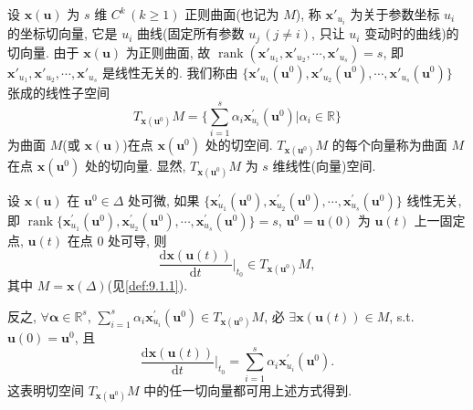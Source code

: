 \begin{definition}\label{def:9.1.2}
设 $\boldsymbol{x}(\boldsymbol{u})$ 为 $s$ 维 $C^{k}\,(k \geqslant 1)$ 正则曲面(也记为 $M$), 称 $\boldsymbol{x}'_{u_i}$ 为关于参数坐标 $u_{i}$ 的坐标切向量, 它是 $u_{i}$ 曲线(固定所有参数 $u_{j}\,(j \neq i)$, 只让 $u_{i}$ 变动时的曲线)的切向量. 由于 $\boldsymbol{x}(\boldsymbol{u})$ 为正则曲面, 故 $\operatorname{rank}(\boldsymbol{x}'_{u_1}, \boldsymbol{x}'_{u_2}, \cdots, \boldsymbol{x}'_{u_s}) = s$, 即 $\boldsymbol{x}'_{u_1}, \boldsymbol{x}'_{u_2}, \cdots, \boldsymbol{x}'_{u_s}$ 是线性无关的. 我们称由 $\{\boldsymbol{x}'_{u_1}(\boldsymbol{u}^0), \boldsymbol{x}'_{u_2}(\boldsymbol{u}^0), \cdots, \boldsymbol{x}'_{u_s}(\boldsymbol{u}^0)\}$ 张成的线性子空间
\[
  T_{\boldsymbol{x}(\boldsymbol{u}^{0})}M = \Big\{\sum_{i=1}^{s}\alpha_{i}\boldsymbol{x}_{u_{i}}^{\prime}(\boldsymbol{u}^{0}) \mathrel{\Big|} \alpha_{i} \in \mathbb{R}\Big\}
\]
为曲面 $M$(或 $\boldsymbol{x}(\boldsymbol{u})$)在点 $\boldsymbol{x}(\boldsymbol{u}^{0})$ 处的切空间. $T_{\boldsymbol{x}(\boldsymbol{u}^{0})}M$ 的每个向量称为曲面 $M$ 在点 $\boldsymbol{x}(\boldsymbol{u}^{0})$ 处的切向量. 显然, $T_{\boldsymbol{x}(\boldsymbol{u}^{0})}M$ 为 $s$ 维线性(向量)空间.
\end{definition}

\begin{theorem}\label{thm:9.1.1}
设 $\boldsymbol{x}(\boldsymbol{u})$ 在 $\boldsymbol{u}^{0} \in \Delta$ 处可微, 如果 $\{\boldsymbol{x}_{u_{1}}^{\prime}(\boldsymbol{u}^{0}), \boldsymbol{x}_{u_{2}}^{\prime}(\boldsymbol{u}^{0}), \cdots, \boldsymbol{x}_{u_{s}}^{\prime}(\boldsymbol{u}^{0})\}$ 线性无关, 即 $\operatorname{rank}\{\boldsymbol{x}_{u_{1}}^{\prime}(\boldsymbol{u}^{0}), \boldsymbol{x}_{u_{2}}^{\prime}(\boldsymbol{u}^{0}), \cdots, \boldsymbol{x}_{u_{s}}^{\prime}(\boldsymbol{u}^{0})\} = s$, $\boldsymbol{u}^{0} = \boldsymbol{u}(0)$ 为 $\boldsymbol{u}(t)$ 上一固定点, $\boldsymbol{u}(t)$ 在点 $0$ 处可导, 则
\[
  \frac{\mathrm{d}\boldsymbol{x}(\boldsymbol{u}(t))}{\mathrm{d}t}\bigg|_{t_0} \in T_{\boldsymbol{x}(\boldsymbol{u}^{0})}M,
\]
其中 $M = \boldsymbol{x}(\Delta)$(见\cref{def:9.1.1}).

反之, $\forall \boldsymbol{\alpha} \in \mathbb{R}^{s}$, $\sum_{i=1}^{s} \alpha_{i} \boldsymbol{x}_{u_{i}}^{\prime}(\boldsymbol{u}^{0}) \in T_{\boldsymbol{x}(\boldsymbol{u}^{0})}M$, 必 $\exists \boldsymbol{x}(\boldsymbol{u}(t)) \in M$, s.t. $\boldsymbol{u}(0) = \boldsymbol{u}^{0}$, 且
\[
  \frac{\mathrm{d}\boldsymbol{x}(\boldsymbol{u}(t))}{\mathrm{d}t}\bigg|_{t_0} = \sum_{i=1}^{s}\alpha_{i}\boldsymbol{x}_{u_{i}}^{\prime}(\boldsymbol{u}^{0}).
\]
这表明切空间 $T_{\boldsymbol{x}(\boldsymbol{u}^{0})}M$ 中的任一切向量都可用上述方式得到.
\end{theorem}

